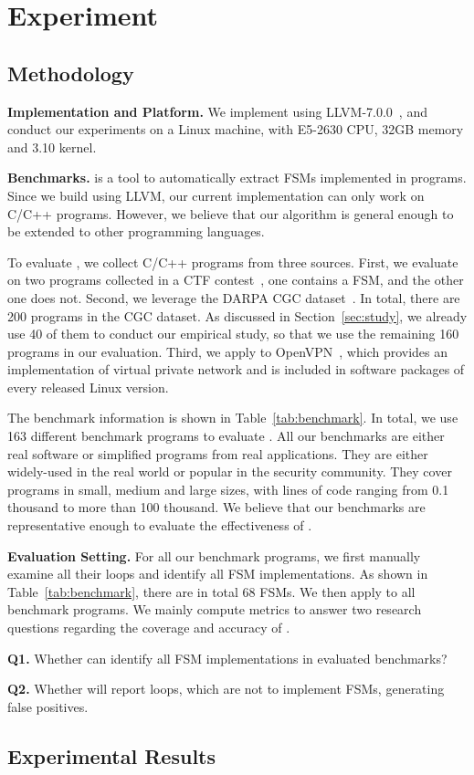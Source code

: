 \section{Experiment}

\subsection{Methodology}

\noindent\textbf{Implementation and Platform.} 
We implement \Tool{} using LLVM-7.0.0~\cite{LLVM}, 
and conduct our experiments on a Linux machine, 
with E5-2630 CPU, 32GB memory and 3.10 kernel. 

\noindent\textbf{Benchmarks.}
\Tool{} is a tool to automatically extract FSMs implemented in programs. 
Since we build \Tool{} using LLVM, 
our current implementation can only work on C/C++ programs.  
However, we believe that our algorithm is general enough 
to be extended to other programming languages. 

To evaluate \Tool{}, we collect C/C++ programs from three sources. 
First, we evaluate \Tool{} on two programs collected in a CTF contest~\cite{ctf}, 
one contains a FSM, and the other one does not. 
Second, we leverage the DARPA CGC dataset~\cite{CGC}. 
In total, there are 200 programs in the CGC dataset.
As discussed in Section~\ref{sec:study}, 
we already use 40 of them to conduct our empirical study,
so that we use the remaining 160 programs in our evaluation.
Third, we apply \Tool{} to OpenVPN~\cite{openvpn}, 
which provides an implementation of virtual private network and 
is included in software packages of every released Linux version. 




The benchmark information is shown in Table~\ref{tab:benchmark}.
In total, we use 163 different benchmark programs to evaluate \Tool{}.
All our benchmarks are either real software or 
simplified programs from real applications. 
They are either widely-used in the real world or popular in the security community. 
They cover programs in small, medium and large sizes, 
with lines of code ranging from 0.1 thousand to more than 100 thousand.  
We believe that our benchmarks are representative 
enough to evaluate the effectiveness of \Tool{}. 

\noindent\textbf{Evaluation Setting.} 
For all our benchmark programs, we first manually examine all their loops and 
identify all FSM implementations. 
As shown in Table~\ref{tab:benchmark}, there are in 
total 68 FSMs. 
We then apply \Tool{} to all benchmark programs. 
We mainly compute metrics to answer two research 
questions regarding the coverage and accuracy of \Tool{}.

\textbf{Q1.} Whether \Tool{} can identify all FSM implementations 
in evaluated benchmarks?
 
\textbf{Q2.} Whether \Tool{} will report loops, which are not to implement FSMs, 
generating false positives. 


\subsection{Experimental Results}

